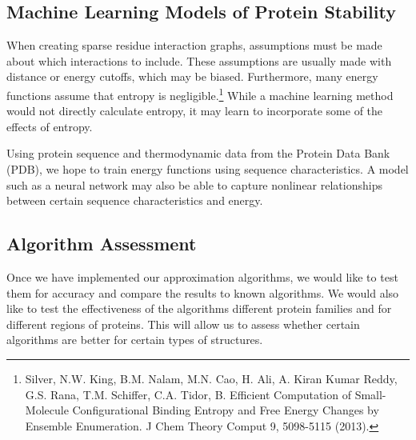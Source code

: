\documentclass[11pt]{article}
\begin{document}
\subsection{Machine Learning Models of Protein Stability}
\par When creating sparse residue interaction graphs, assumptions must be made about which interactions to include.  These assumptions are usually made with distance or energy cutoffs, which may be biased.  Furthermore, many energy functions assume that entropy is negligible.\footnote{Silver, N.W. King, B.M. Nalam, M.N. Cao, H. Ali, A. Kiran Kumar Reddy, G.S. Rana, T.M. Schiffer, C.A. Tidor, B.
Efficient Computation of Small-Molecule Configurational Binding Entropy and Free Energy Changes by Ensemble Enumeration. J Chem Theory Comput 9, 5098-5115 (2013).}  While a machine learning method would not directly calculate entropy, it may learn to incorporate some of the effects of entropy.  

\par Using protein sequence and thermodynamic data from the Protein Data Bank (PDB), we hope to train energy functions using sequence characteristics. A model such as a neural network may also be able to capture nonlinear relationships between certain sequence characteristics and energy.

\subsection{Algorithm Assessment}
Once we have implemented our approximation algorithms, we would like to test them for accuracy and compare the results to known algorithms.  We would also like to test the effectiveness of the algorithms different protein families and for different regions of proteins.  This will allow us to assess whether certain algorithms are better for certain types of structures.
\end{document}
